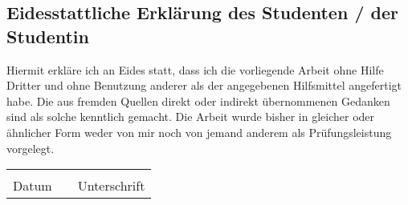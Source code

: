 \documentclass[12pt]{article}
\begin{document}
\pagestyle{fancy} %
\fancyhf{} %

\vspace*{1.5em}

\subsection*{Eidesstattliche Erklärung des Studenten / der Studentin}

Hiermit erkläre ich an Eides statt, dass ich die vorliegende Arbeit ohne Hilfe Dritter und ohne
Benutzung anderer als der angegebenen Hilfsmittel angefertigt habe. Die aus fremden
Quellen direkt oder indirekt übernommenen Gedanken sind als solche kenntlich gemacht.
Die Arbeit wurde bisher in gleicher oder ähnlicher Form weder von mir noch von jemand
anderem als Prüfungsleistung vorgelegt.

\vspace{3em}

\renewcommand{\arraystretch}{1.5} %

\begin{tabular}{%
        m{}
        m{}
        m{}
    }
          &  &              \\ \cline{1-1} \cline{3-3}
    Datum &  & Unterschrift \\
\end{tabular}
\end{document}

